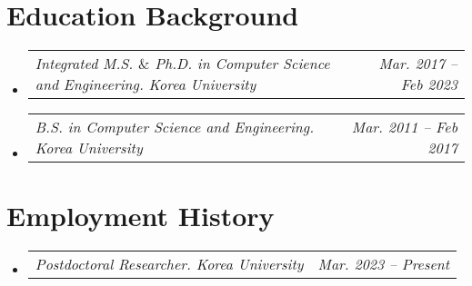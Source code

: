 \documentclass[letterpaper,11pt]{article}
\makeatletter
\newcommand{\resumeSubheadingTwo}[2]{
  \vspace{-2pt}\item
    \begin{tabular*}{1.0\textwidth}[t]{l@{\extracolsep{\fill}}r}
      \textit{#1} & \textit{#2} \\
    \end{tabular*}\vspace{-7pt}
}
\newcommand{\resumeSubheading}[4]{
  \vspace{-2pt}\item
    \begin{tabular*}{1.0\textwidth}[t]{l@{\extracolsep{\fill}}r}
      \textbf{#1} & \textbf{\small #2} \\
      \textit{\small#3} & \textit{\small #4} \\
    \end{tabular*}\vspace{-7pt}
}
\newcommand{\resumeSubHeadingListStart}{\begin{itemize}[leftmargin=0.0in, label={}]}
\newcommand{\resumeSubHeadingListEnd}{\end{itemize}}
\makeatother
\begin{document}






\section{Education Background}
  \resumeSubHeadingListStart
  \resumeSubheadingTwo
      {Integrated M.S. $\&$ Ph.D. in Computer Science and Engineering. Korea University}{Mar. 2017 -- Feb 2023}\vspace{-12pt}
      \resumeSubheadingTwo
      {B.S. in Computer Science and Engineering. Korea University}{Mar. 2011 -- Feb 2017}      
  \resumeSubHeadingListEnd


\section{Employment History}
\resumeSubHeadingListStart
    \resumeSubheadingTwo
    {Postdoctoral Researcher. Korea University}{Mar. 2023 -- Present}\vspace{-15pt}  
\resumeSubHeadingListEnd
\end{document}
